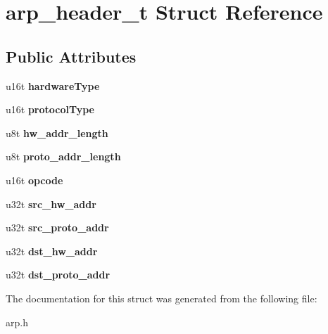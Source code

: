 \hypertarget{structarp__header__t}{}\section{arp\+\_\+header\+\_\+t Struct Reference}
\label{structarp__header__t}
\subsection*{Public Attributes}
\begin{DoxyCompactItemize}
\item 
\mbox{\label{structarp__header__t_a30ab898c2a564e7408613652cf79b8d8}} 
u16t {\bfseries hardware\+Type}
\item 
\mbox{\label{structarp__header__t_acbb78139544442faee7195e169409d60}} 
u16t {\bfseries protocol\+Type}
\item 
\mbox{\label{structarp__header__t_a5156b4d2e73aba03f0fbfbd39a74bc00}} 
u8t {\bfseries hw\+\_\+addr\+\_\+length}
\item 
\mbox{\label{structarp__header__t_a7a74a900ee0f6265d46c70fa0a40a7e8}} 
u8t {\bfseries proto\+\_\+addr\+\_\+length}
\item 
\mbox{\label{structarp__header__t_aa63541f0b0baec9ff726136825448914}} 
u16t {\bfseries opcode}
\item 
\mbox{\label{structarp__header__t_acab286049f5df99a5020a1ffae09f986}} 
u32t {\bfseries src\+\_\+hw\+\_\+addr}
\item 
\mbox{\label{structarp__header__t_ad95533ce31b86cb7cce594fbc4c16afb}} 
u32t {\bfseries src\+\_\+proto\+\_\+addr}
\item 
\mbox{\label{structarp__header__t_aa44af082ce33f0f966658b20b1267780}} 
u32t {\bfseries dst\+\_\+hw\+\_\+addr}
\item 
\mbox{\label{structarp__header__t_a4022c65d431339221111502464c1a39e}} 
u32t {\bfseries dst\+\_\+proto\+\_\+addr}
\end{DoxyCompactItemize}


The documentation for this struct was generated from the following file\+:\begin{DoxyCompactItemize}
\item 
arp.\+h\end{DoxyCompactItemize}
